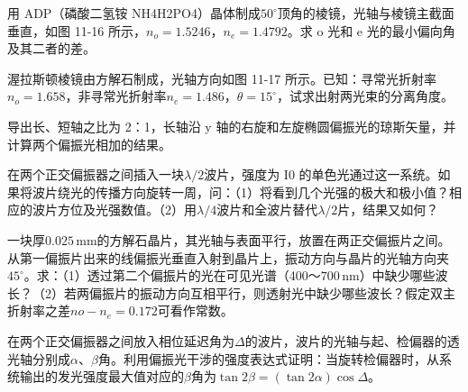 \documentclass[padl, analysis, notocnum]{ExBook}
\newcommand{\answerarea}[1][3.5cm]{%
  \par\vspace{1mm}%
  \noindent{\color{themeColor!35}\rule{\linewidth}{0.4pt}}\par
  \noindent\begin{minipage}[t][#1][t]{\linewidth}\vspace{0pt}\end{minipage}\par
  \noindent{\color{themeColor!35}\rule{\linewidth}{0.4pt}}\par
}
\begin{document}
\begin{qitems}[startnum=3]
\qitem 用 ADP（磷酸二氢铵 NH4H2PO4）晶体制成$50^{\circ}$顶角的棱镜，光轴与棱镜主截面垂直，如图 11-16 所示，$n_{o}=1.5246$，$n_{e}=1.4792$。求 o 光和 e 光的最小偏向角及其二者的差。
\label{q:337:start}
\answerarea[2.4cm]
\label{q:337:end}
\end{qitems}

\begin{qitems}[startnum=4]
\qitem 渥拉斯顿棱镜由方解石制成，光轴方向如图 11-17 所示。已知：寻常光折射率$n_{o}=1.658$，非寻常光折射率$n_{e}=1.486$，$\theta =15^{\circ}$，试求出射两光束的分离角度。
\label{q:338:start}
\answerarea[2.4cm]
\label{q:338:end}
\end{qitems}

\begin{qitems}[startnum=5]
\qitem 导出长、短轴之比为 2：1，长轴沿 y 轴的右旋和左旋椭圆偏振光的琼斯矢量，并计算两个偏振光相加的结果。
\label{q:339:start}
\answerarea[7.0cm]
\label{q:339:end}
\end{qitems}

\begin{qitems}[startnum=6]
\qitem 在两个正交偏振器之间插入一块$\lambda /2$波片，强度为 I0 的单色光通过这一系统。如果将波片绕光的传播方向旋转一周，问：（1）将看到几个光强的极大和极小值？相应的波片方位及光强数值。（2）用$\lambda /4$波片和全波片替代$\lambda /2$片，结果又如何？
\label{q:340:start}
\answerarea[7.0cm]
\label{q:340:end}
\end{qitems}

\begin{qitems}[startnum=7]
\qitem 一块厚$0.025\,\mathrm{mm}$的方解石晶片，其光轴与表面平行，放置在两正交偏振片之间。从第一偏振片出来的线偏振光垂直入射到晶片上，振动方向与晶片的光轴方向夹$45^{\circ}$。求：（1）透过第二个偏振片的光在可见光谱（400～$700\,\mathrm{nm}$）中缺少哪些波长？（2）若两偏振片的振动方向互相平行，则透射光中缺少哪些波长？假定双主折射率之差$no-n_{e}=0.172$可看作常数。
\label{q:341:start}
\answerarea[7.0cm]
\label{q:341:end}
\end{qitems}

\begin{qitems}[startnum=8]
\qitem 在两个正交偏振器之间放入相位延迟角为$\Delta$的波片，波片的光轴与起、检偏器的透光轴分别成$\alpha$、$\beta$角。利用偏振光干涉的强度表达式证明：当旋转检偏器时，从系统输出的发光强度最大值对应的$\beta$角为$\tan 2\beta =(\tan 2\alpha )\cos \Delta$。
\label{q:342:start}
\answerarea[7.0cm]
\label{q:342:end}
\end{qitems}
\end{document}
